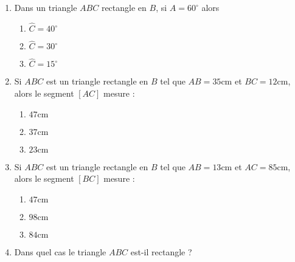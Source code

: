 \documentclass[oneside,twoside]{book}
\begin{document}
\begin{enumerate}
\item Dans un triangle $ABC$ rectangle en $B$, si $\widehat{A}=60^{\circ}$ alors

\begin{enumerate}

\item\MauvaiseReponse $\widehat{C}=40^{\circ}$

\item\BonneReponse $\widehat{C}=30^{\circ}$

\item\MauvaiseReponse $\widehat{C}=15^{\circ}$


\end{enumerate}



\item Si $ABC$ est un triangle rectangle en $B$ tel que $AB=35\mathrm{cm}$ et $BC=12\mathrm{cm}$, alors le segment $\left[AC\right]$ mesure :

\begin{enumerate}


\item\MauvaiseReponse $47\mathrm{cm}$

\item\BonneReponse $37\mathrm{cm}$

\item\MauvaiseReponse $23\mathrm{cm}$

\end{enumerate}



\item Si $ABC$ est un triangle rectangle en $B$ tel que $AB=13\mathrm{cm}$ et $AC=85\mathrm{cm}$, alors le segment $\left[BC\right]$ mesure :

\begin{enumerate}


\item\MauvaiseReponse $47\mathrm{cm}$

\item\MauvaiseReponse $98\mathrm{cm}$

\item\BonneReponse $84\mathrm{cm}$

\end{enumerate}

\newpage

\item Dans quel cas le triangle $ABC$ est-il rectangle ?

\begin{enumerate}


\end{enumerate}
\end{enumerate}
\end{document}
